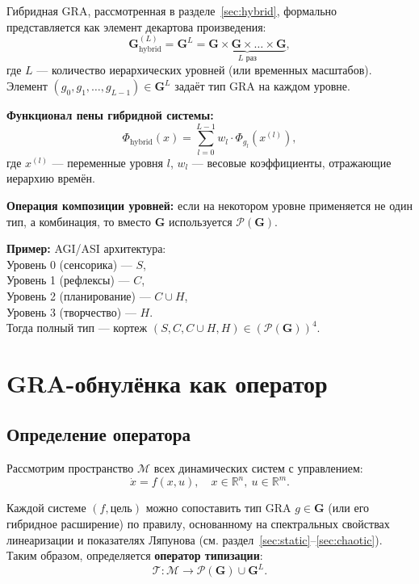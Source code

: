 \documentclass[12pt,a4paper]{article}
\newcommand{\R}{\mathbb{R}}
\newcommand{\G}{\mathbf{G}}
\newcommand{\M}{\mathcal{M}}
\newcommand{\T}{\mathcal{T}}
\newcommand{\Pset}{\mathcal{P}}
\begin{document}
Гибридная GRA, рассмотренная в разделе~\ref{sec:hybrid}, формально представляется как элемент декартова произведения:
\begin{equation}
    \G_{\text{hybrid}}^{(L)} = \G^L = \underbrace{\G \times \G \times \dots \times \G}_{L \text{ раз}},
\end{equation}
где $L$ — количество иерархических уровней (или временных масштабов). Элемент $(g_0, g_1, \dots, g_{L-1}) \in \G^L$ задаёт тип GRA на каждом уровне.

\textbf{Функционал пены гибридной системы:}
\begin{equation}
    \Phi_{\text{hybrid}}(x) = \sum_{l=0}^{L-1} w_l \cdot \Phi_{g_l}(x^{(l)}),
\end{equation}
где $x^{(l)}$ — переменные уровня $l$, $w_l$ — весовые коэффициенты, отражающие иерархию времён.

\textbf{Операция композиции уровней:} если на некотором уровне применяется не один тип, а комбинация, то вместо $\G$ используется $\Pset(\G)$.

\textbf{Пример:} AGI/ASI архитектура: \\
Уровень 0 (сенсорика) — $S$, \\
Уровень 1 (рефлексы) — $C$, \\
Уровень 2 (планирование) — $C \cup H$, \\
Уровень 3 (творчество) — $H$. \\
Тогда полный тип — кортеж $(S, C, C \cup H, H) \in (\Pset(\G))^4$.

\section{GRA-обнулёнка как оператор}
\label{sec:operator}

\subsection{Определение оператора}

Рассмотрим пространство $\M$ всех динамических систем с управлением:
\begin{equation}
    \dot{x} = f(x, u), \quad x \in \R^n,\ u \in \R^m.
\end{equation}

Каждой системе $(f, \text{цель})$ можно сопоставить тип GRA $g \in \G$ (или его гибридное расширение) по правилу, основанному на спектральных свойствах линеаризации и показателях Ляпунова (см. раздел~\ref{sec:static}--\ref{sec:chaotic}). Таким образом, определяется \textbf{оператор типизации}:
\begin{equation}
    \T : \M \to \Pset(\G) \cup \G^L.
\end{equation}
\end{document}
